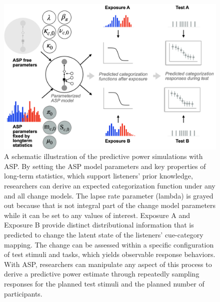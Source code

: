 \documentclass[
  11pt,
  english,
  man,floatsintext]{apa6}
\begin{document}
\begin{figure}[h]
\begin{center}
\includegraphics[width=.7\columnwidth]{../figures/diagrams/predictive-power-simulations.png}
\caption{A schematic illustration of the predictive power simulations with ASP. By setting the ASP model parameters and key properties of long-term statistics, which support listeners' prior knowledge, researchers can derive an expected categorization function under any and all change models. The lapse rate parameter (lambda) is grayed out because that is not integral part of the change model parameters while it can be set to any values of interest. Exposure A and Exposure B provide distinct distributional information that is predicted to change the latent state of the listeners' cue-category mapping. The change can be assessed within a specific configuration of test stimuli and tasks, which yields observable response behaviors. With ASP, researchers can manipulate any aspect of this process to derive a predictive power estimate through repeatedly sampling responses for the planned test stimuli and the planned number of participants.}\label{fig:predictive-power-simulations}
\end{center}
\end{figure}
\end{document}
